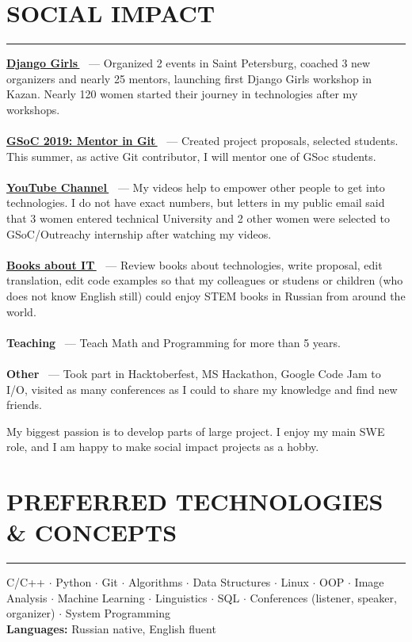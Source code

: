 \documentclass[11pt]{res} %
\let\orighref\href
\renewcommand{\href}[2]{\orighref{#1}{#2\,\faExternalLink}}
\begin{document}
\begin{resume}
\section{\uppercase{Social Impact}}
\begin{spacing}{0.3}
\textcolor[RGB]{220,220,220}{\rule{\linewidth}{0.4pt}} 
\end{spacing}
\textbf{\href{http://djangogirls.org/stpetersburg/}{Django Girls}} ~--- Organized 2 events in Saint Petersburg, coached 3 new organizers and nearly 25 mentors, launching first Django Girls workshop in Kazan. Nearly 120 women started their journey in technologies after my workshops.\\ \\
\textbf{\href{https://git.github.io/SoC-2019-Ideas/}{GSoC 2019: Mentor in Git}} ~--- Created project proposals, selected students. This summer, as active Git contributor, I will mentor one of GSoc students.\\ \\
\textbf{\href{https://www.youtube.com/programming_together/}{YouTube Channel}} ~--- My videos help to empower other people to get into technologies. I do not have exact numbers, but letters in my public email said that 3 women entered technical University and 2 other women were selected to GSoC/Outreachy internship after watching my videos.\\ \\
\textbf{\href{https://dmkpress.com/catalog/computer/}{Books about IT}} ~--- Review books about technologies, write proposal, edit translation, edit code examples so that my colleagues or studens or children (who does not know English still) could enjoy STEM books in Russian from around the world.\\ \\
\textbf{Teaching} ~--- Teach Math and Programming for more than 5 years.\\ \\
\textbf{Other} ~--- Took part in Hacktoberfest, MS Hackathon, Google Code Jam to I/O, visited as many conferences as I could to share my knowledge and find new friends. 

My biggest passion is to develop parts of large project. I enjoy my main SWE role, and I am happy to make social impact projects as a hobby.

\section{\uppercase{Preferred technologies \& concepts}}
\begin{spacing}{0.3}
\textcolor[RGB]{220,220,220}{\rule{\linewidth}{0.4pt}} 
\end{spacing}
C/C++ $\cdot$ Python $\cdot$ Git $\cdot$ Algorithms $\cdot$ Data Structures $\cdot$ Linux $\cdot$ OOP $\cdot$ Image Analysis $\cdot$ Machine Learning $\cdot$ Linguistics $\cdot$ SQL $\cdot$ Conferences (listener, speaker, organizer) $\cdot$ System Programming \\
\textbf{Languages:} Russian native, English fluent
\end{resume}
\end{document}

